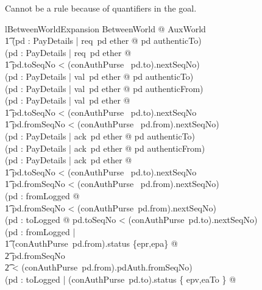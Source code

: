 Cannot be a rule because of quantifiers in the goal.
%
\begin{LNewLemma}
\begin{theorem}{lBetweenWorldExpansion}
    \forall BetweenWorld @
    AuxWorld \land \\ \t1
    (\forall pd : PayDetails | req~pd \in ether @ pd \in authenticTo) \\
    \land
    (\forall pd : PayDetails | req~pd \in ether @ \\
        \t1 pd.toSeqNo < (conAuthPurse~ pd.to).nextSeqNo) \\
    \land
    (\forall pd : PayDetails | val~pd \in ether @ pd \in authenticTo) \\
    \land
    (\forall pd : PayDetails | val~pd \in ether @ pd \in authenticFrom) \\
    \land
    (\forall pd : PayDetails | val~pd \in ether @ \\
        \t1 pd.toSeqNo < (conAuthPurse~ pd.to).nextSeqNo \\
        \t1 \land pd.fromSeqNo < (conAuthPurse~ pd.from).nextSeqNo) \\
    \land
    (\forall pd : PayDetails | ack~pd \in ether @ pd \in authenticTo) \\
    \land
    (\forall pd : PayDetails | ack~pd \in ether @ pd \in authenticFrom) \\
    \land
    (\forall pd : PayDetails | ack~pd \in ether @ \\
        \t1 pd.toSeqNo < (conAuthPurse~ pd.to).nextSeqNo  \\ %
        \t1 \land pd.fromSeqNo < (conAuthPurse~ pd.from).nextSeqNo) \\
    \land %
    (\forall pd : fromLogged @  \\ %
        \t1 pd.fromSeqNo < (conAuthPurse~pd.from).nextSeqNo) \\
    \land %
    (\forall pd : toLogged @ pd.toSeqNo < (conAuthPurse~pd.to).nextSeqNo) \\
    \land %
    (\forall pd : fromLogged | \\ %
        \t1 (conAuthPurse~pd.from).status \in \{epr,epa\} @  \\ %
        \t2 pd.fromSeqNo \\ %
        \t2 < (conAuthPurse~pd.from).pdAuth.fromSeqNo) \\
    \land %
    (\forall pd : toLogged | (conAuthPurse~pd.to).status \in \{ epv,eaTo \} @ \\ %

\end{theorem}
\end{LNewLemma}
